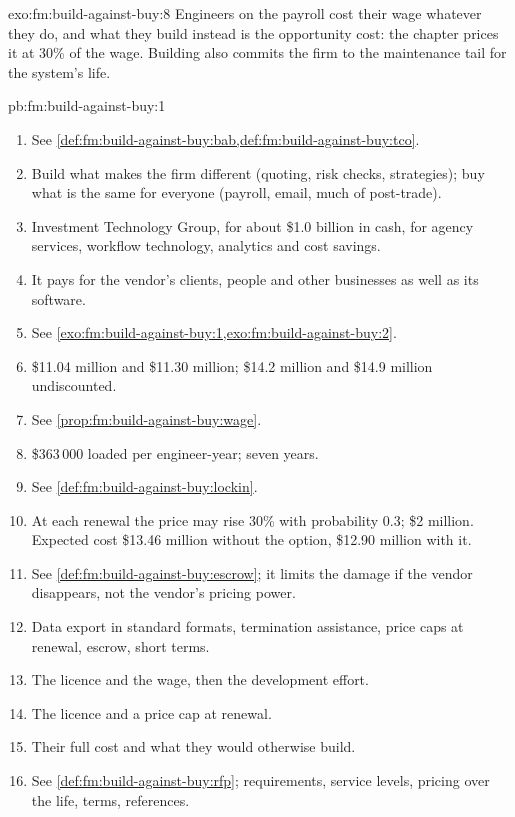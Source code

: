 \begin{solution}{exo:fm:build-against-buy:8}
Engineers on the payroll cost their wage whatever they do, and what they build instead is the opportunity cost: the chapter prices it at 30\% of the
wage. Building also commits the firm to the maintenance tail for the system's life.
\end{solution}

\begin{solution}{pb:fm:build-against-buy:1}
\begin{enumerate}
\item See \cref{def:fm:build-against-buy:bab,def:fm:build-against-buy:tco}.
\item Build what makes the firm different (quoting, risk checks, strategies); buy what is the same for everyone (payroll, email, much of post-trade).
\item Investment Technology Group, for about \$1.0 billion in cash, for agency services, workflow technology, analytics and cost savings.
\item It pays for the vendor's clients, people and other businesses as well as its software.
\item See \cref{exo:fm:build-against-buy:1,exo:fm:build-against-buy:2}.
\item \$11.04 million and \$11.30 million; \$14.2 million and \$14.9 million undiscounted.
\item See \cref{prop:fm:build-against-buy:wage}.
\item \$363\,000 loaded per engineer-year; seven years.
\item See \cref{def:fm:build-against-buy:lockin}.
\item At each renewal the price may rise 30\% with probability 0.3;  \$2 million. Expected cost \$13.46 million without the option, \$12.90
million with it.
\item See \cref{def:fm:build-against-buy:escrow}; it limits the damage if the vendor disappears, not the vendor's pricing power.
\item Data export in standard formats, termination assistance, price caps at renewal, escrow, short terms.
\item The licence and the wage, then the development effort.
\item The licence and a price cap at renewal.
\item Their full cost and what they would otherwise build.
\item See \cref{def:fm:build-against-buy:rfp}; requirements, service levels, pricing over the life, terms, references.

\end{enumerate}
\end{solution}
